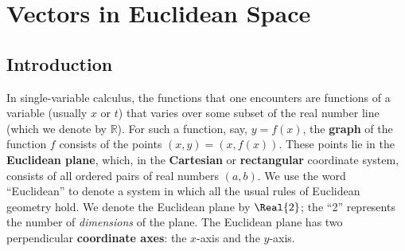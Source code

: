 \chapter{Vectors in Euclidean Space}
\section{Introduction}
In single-variable calculus, the functions that one encounters are functions of a variable (usually $x$ or $t$) 
that varies over some subset of the real number line (which we denote by $\mathbb{R}$).  For such a function, say,
$y = f(x)$, the \textbf{graph} of the function $f$ consists of the points $(x, y) = (x, f(x))$.  These points lie in
the \textbf{Euclidean plane}, which, in the \textbf{Cartesian} or
\textbf{rectangular} coordinate system, consists
of all ordered pairs of real numbers $(a, b)$.  We use the word ``Euclidean'' to denote a system in which all the
usual rules of Euclidean geometry hold.  We denote the Euclidean plane by $\Real{2}$;
the ``2'' represents
the number of \emph{dimensions} of the plane.  The Euclidean plane has two perpendicular
\textbf{coordinate axes}: the $x$-axis and the $y$-axis.

